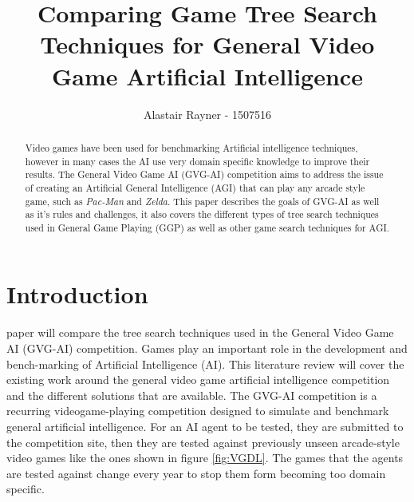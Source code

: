 \documentclass[journal]{IEEEtran}
\begin{document}
%
\title{Comparing Game Tree Search Techniques for General Video Game Artificial Intelligence}
%
%
\author{Alastair Rayner - 1507516}


\maketitle

\begin{abstract}
	Video games have been used for benchmarking Artificial intelligence techniques, however in many cases the AI use very domain specific knowledge to improve their results. 
	The General Video Game AI (GVG-AI) competition aims to address the issue of creating an Artificial General Intelligence (AGI) that can play any arcade style game, such as \textit{Pac-Man} and \textit{Zelda}. This paper describes the goals of GVG-AI as well as it's rules and challenges, it also covers the different types of tree search techniques used in General Game Playing (GGP) as well as other game search techniques for AGI.
	
	
\end{abstract}

\section{Introduction}
 paper will compare the tree search techniques used in the General Video Game AI (GVG-AI) competition.  
Games play an important role in the development and bench-marking of Artificial Intelligence (AI). This literature review will cover the existing work around the general video game artificial intelligence competition and the different solutions that are available.
The GVG-AI competition is a recurring videogame-playing competition designed to simulate and benchmark general artificial intelligence. For an AI agent to be tested, they are submitted to the competition site, then they are tested against previously unseen arcade-style video games like the ones shown in figure \ref{fig:VGDL}. The games that the agents are tested against change every year to stop them form becoming too domain specific.
\end{document}
